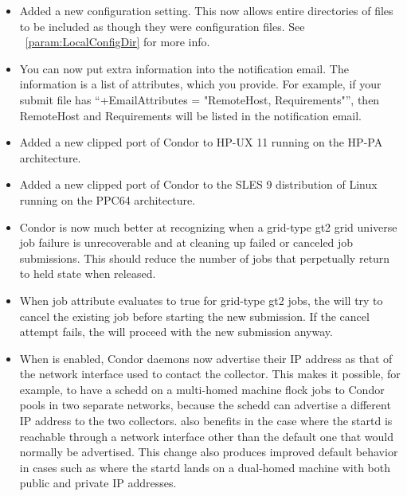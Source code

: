 \begin{itemize}


\item Added a new  configuration setting. 
This now allows entire directories of files to be included as though they
were configuration files. 
See ~\ref{param:LocalConfigDir} for more info.

\item You can now put extra information into the notification
email. The information is a list of attributes, which you provide. For
example, if your submit file has ``+EmailAttributes = "RemoteHost,
Requirements"'', then RemoteHost and Requirements will be listed in
the notification email. 

\item Added a new clipped port of Condor to HP-UX 11 running on 
the HP-PA architecture.

\item Added a new clipped port of Condor to the SLES 9 distribution of
Linux running on the PPC64 architecture.

\item Condor is now much better at recognizing when a grid-type gt2 grid
universe job failure is unrecoverable and at cleaning up failed or canceled
job submissions. This should reduce the number of jobs
that perpetually return to held state when released.

\item When job attribute  evaluates to true for
grid-type gt2 jobs, the
 will try to cancel the existing job before starting
the new submission. If the cancel attempt fails, the 
will proceed with the new submission anyway.

\item When  is enabled, Condor daemons
now advertise their IP address as that of the network interface used
to contact the collector.  This makes it possible, for example, to
have a schedd on a multi-homed machine flock jobs to Condor pools in
two separate networks, because the schedd can advertise a different IP
address to the two collectors.   also benefits in the case
where the startd is reachable through a network interface other than
the default one that would normally be advertised.  This change also
produces improved default behavior in cases such as 
where the startd lands on a dual-homed machine with both public
and private IP addresses.


\end{itemize}
